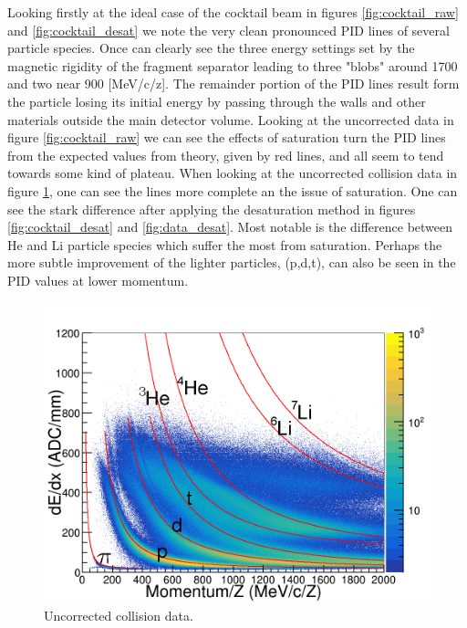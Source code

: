 \documentclass[review]{elsarticle}
\begin{document}
Looking firstly at the ideal case of the cocktail beam in figures \ref{fig:cocktail_raw} and \ref{fig:cocktail_desat} we note the very clean pronounced PID lines of several particle species. Once can clearly see the three  energy settings set by the magnetic rigidity of the fragment separator leading to three "blobs" around 1700 and two near 900 [MeV/c/z]. The remainder portion of the PID lines result form the particle losing its initial energy by passing through the walls and other materials outside the main detector volume. Looking at the uncorrected data in figure \ref{fig:cocktail_raw} we can see the effects of saturation turn the PID lines from the expected values from theory, given by red lines, and all seem to tend towards some kind of plateau. When looking at the uncorrected collision data in figure \ref{fig:data_raw}, one can see the lines more complete an the issue of saturation. One can see the stark difference after applying the desaturation method in figures \ref{fig:cocktail_desat} and \ref{fig:data_desat}. Most notable is the difference between He and Li particle species which suffer the most from saturation. Perhaps the more subtle improvement of the lighter particles, (p,d,t), can also be seen in the PID values at lower momentum.
 

\begin{figure}[ht]
\label{fig:data_raw}
\includegraphics[width=\linewidth]{data_raw}
\caption{Uncorrected collision data.}
\end{figure}
\end{document}
